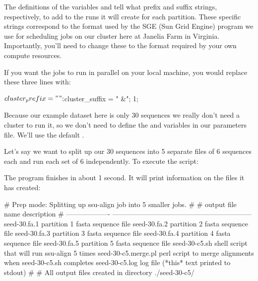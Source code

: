 The definitions of the variables  and
 tell  what prefix and suffix
strings, respectively, to add to the  runs it will
create for each partition. These specific strings correspond to the
format used by the SGE (Sun Grid Engine)  program we use
for scheduling jobs on our cluster here at Janelia Farm in Virginia.
Importantly, you'll need to change these to the format required by
your own compute resources.

If you want the jobs to run in parallel on your local machine, you
would replace these three lines with:
\begin{sreoutput}
$cluster_prefix = "";
$cluster_suffix = " &";
1;
\end{sreoutput}

Because our example dataset here is only 30 sequences we really don't
need a cluster to run it, so we don't need to define the
 and  variables in our
parameters file. We'll use the default .

Let's say we want to split up our 30 sequences into 5 separate files
of 6 sequences each and run each set of 6 independently. 
To execute the script:


The program finishes in about 1 second. It will print information on
the files it has created:

\begin{comment}
# ssu-align :: define and align SSU rRNA sequences
# SSU-ALIGN 0.1 (June 2009)
# Copyright (C) 2009 HHMI Janelia Farm Research Campus
# Freely distributed under the GNU General Public License (GPLv3)
# - - - - - - - - - - - - - - - - - - - - - - - - - - - - - - - - - - - -
# command: ssu-align -c 5 ssu3-0p1.cm seed-30.fa seed-30-c5 sa-0p1.params
# date:    Wed Aug 19 18:57:15 2009
#
\end{comment}
\begin{sreoutput}
# Prep mode: Splitting up ssu-align job into 5 smaller jobs.
#
# output file name     description                                                 
# -------------------  ------------------------------------------------------------
  seed-30.fa.1         partition 1 fasta sequence file
  seed-30.fa.2         partition 2 fasta sequence file
  seed-30.fa.3         partition 3 fasta sequence file
  seed-30.fa.4         partition 4 fasta sequence file
  seed-30.fa.5         partition 5 fasta sequence file
  seed-30-c5.sh        shell script that will run ssu-align 5 times
  seed-30-c5.merge.pl  perl script to merge alignments when seed-30-c5.sh completes
  seed-30-c5.log       log file (*this* text printed to stdout)
#
# All output files created in directory ./seed-30-c5/
\end{sreoutput}

